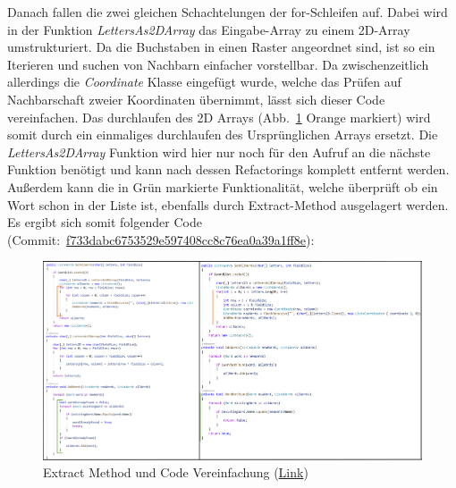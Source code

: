 Danach fallen die zwei gleichen Schachtelungen der for-Schleifen auf. Dabei wird in der Funktion \textit{LettersAs2DArray} das Eingabe-Array zu einem 2D-Array umstrukturiert. Da die Buchstaben in einen Raster angeordnet sind, ist so ein Iterieren und suchen von Nachbarn einfacher vorstellbar. Da zwischenzeitlich allerdings die \textit{Coordinate} Klasse eingefügt wurde, welche das Prüfen auf Nachbarschaft zweier Koordinaten übernimmt, lässt sich dieser Code vereinfachen. Das durchlaufen des 2D Arrays (Abb.~\ref{Abb:CodeVereinfachen} Orange markiert) wird somit durch ein einmaliges durchlaufen des Ursprünglichen Arrays ersetzt. Die \textit{LettersAs2DArray} Funktion wird hier nur noch für den Aufruf an die nächste Funktion benötigt und kann nach dessen Refactorings komplett entfernt werden. Außerdem kann die in Grün markierte Funktionalität, welche überprüft ob ein Wort schon in der Liste ist, ebenfalls durch Extract-Method ausgelagert werden. Es ergibt sich somit folgender Code (Commit:~\href{https://github.com/EinToni/Wortfinder/commit/f733dabc6753529e597408cc8c76ea0a39a1ff8e}{f733dabc6753529e597408cc8c76ea0a39a1ff8e}):

\begin{figure}[!ht]
  \centering
  \includegraphics[width=\textwidth]{Bilder/CodeVereinfachen.PNG}
  \caption[Extract Method und Code Vereinfachung]{Extract Method und Code Vereinfachung (\href{https://github.com/EinToni/WortfinderDoku/blob/main/Bilder/CodeVereinfachen.png}{Link})}
  \label{Abb:CodeVereinfachen}
\end{figure}

